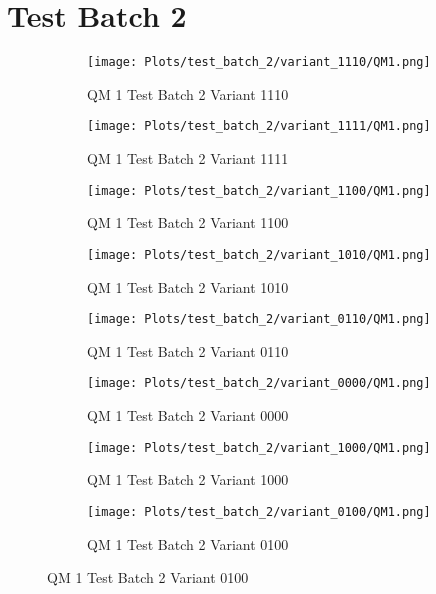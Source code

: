 \documentclass{DissertateFigs}
\begin{document}
\section{Test Batch 2}
\begin{figure}[t!]
    \begin{subfigure}{0.47\textwidth}
    \texttt{[image: Plots/test\_batch\_2/variant\_1110/QM1.png]}
    \caption{QM 1 Test Batch 2 Variant 1110}
    \end{subfigure}
    \begin{subfigure}{0.47\textwidth}
    \texttt{[image: Plots/test\_batch\_2/variant\_1111/QM1.png]}
    \caption{QM 1 Test Batch 2 Variant 1111}
    \end{subfigure}

\medskip

    \begin{subfigure}{0.47\textwidth}
    \texttt{[image: Plots/test\_batch\_2/variant\_1100/QM1.png]}
    \caption{QM 1 Test Batch 2 Variant 1100}
    \end{subfigure}
    \begin{subfigure}{0.47\textwidth}
    \texttt{[image: Plots/test\_batch\_2/variant\_1010/QM1.png]}
    \caption{QM 1 Test Batch 2 Variant 1010}
    \end{subfigure}

\medskip

    \begin{subfigure}{0.47\textwidth}
    \texttt{[image: Plots/test\_batch\_2/variant\_0110/QM1.png]}
    \caption{QM 1 Test Batch 2 Variant 0110}
    \end{subfigure}
    \begin{subfigure}{0.47\textwidth}
    \texttt{[image: Plots/test\_batch\_2/variant\_0000/QM1.png]}
    \caption{QM 1 Test Batch 2 Variant 0000}
    \end{subfigure}

\medskip

    \begin{subfigure}{0.47\textwidth}
    \texttt{[image: Plots/test\_batch\_2/variant\_1000/QM1.png]}
    \caption{QM 1 Test Batch 2 Variant 1000}
    \end{subfigure}
    \begin{subfigure}{0.47\textwidth}
    \texttt{[image: Plots/test\_batch\_2/variant\_0100/QM1.png]}
    \caption{QM 1 Test Batch 2 Variant 0100}
    \end{subfigure}


\end{figure}
\end{document}
